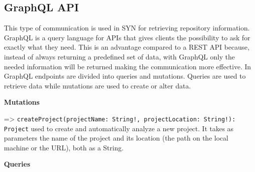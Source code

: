 \subsection*{GraphQL API} 
This type of communication is used in SYN for retrieving repository information.
GraphQL is a query language for APIs that gives clients the possibility to ask for exactly what they need.
This is an advantage compared to a REST API because, instead of always returning a predefined set of data, with GraphQL only the needed information will be returned making the communication more effective. 
In GraphQL endpoints are divided into queries and mutations. Queries are used to retrieve data while mutations are used to create or alter data. 

\bigbreak
\textbf{Mutations}

=> \texttt{createProject(projectName: String!, projectLocation: String!): Project} 
used to create and automatically analyze a new project.
It takes as parameters the name of the project and its location (the path on the local machine or the URL), both as a String. 

\bigbreak
\textbf{Queries}

